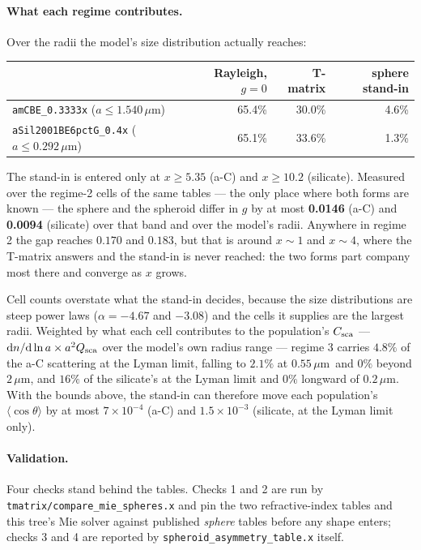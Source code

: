 \documentclass{my_memo}
\newcommand{\code}[1]{\texttt{#1}}
\newcommand{\um}{\ensuremath{\,\mu\mathrm{m}}}
\begin{document}
\paragraph{What each regime contributes.} Over the radii the model's size
distribution actually reaches:

\begin{center}
\begin{tabular}{@{}lrrr@{}}
\toprule
 & Rayleigh, $g=0$ & T-matrix & sphere stand-in \\
\midrule
\code{amCBE\_0.3333x} ($a \le 1.540$\um)        & 65.4\% & 30.0\% & 4.6\% \\
\code{aSil2001BE6pctG\_0.4x} ($a \le 0.292$\um) & 65.1\% & 33.6\% & 1.3\% \\
\bottomrule
\end{tabular}
\end{center}

\noindent The stand-in is entered only at $x \ge 5.35$ (a-C) and $x \ge 10.2$
(silicate). Measured over the regime-2 cells of the same tables --- the only
place where both forms are known --- the sphere and the spheroid differ in $g$
by at most \textbf{0.0146} (a-C) and \textbf{0.0094} (silicate) over that
band and over the model's radii. Anywhere in regime 2 the gap reaches $0.170$
and $0.183$, but that is around $x \sim 1$ and $x \sim 4$, where the T-matrix
answers and the stand-in is never reached: the two forms part company most
there and converge as $x$ grows.

Cell counts overstate what the stand-in decides, because the size
distributions are steep power laws ($\alpha = -4.67$ and $-3.08$) and the
cells it supplies are the largest radii. Weighted by what each cell
contributes to the population's $C_{\rm sca}$ --- ${\rm d}n/{\rm d}\ln a
\times a^2 Q_{\rm sca}$ over the model's own radius range --- regime 3 carries
$4.8\%$ of the a-C scattering at the Lyman limit, falling to $2.1\%$ at
$0.55$\um\ and $0\%$ beyond $2$\um, and $16\%$ of the silicate's at the Lyman
limit and $0\%$ longward of $0.2$\um. With the bounds above, the stand-in can
therefore move each population's $\langle\cos\theta\rangle$ by at most
$7\times10^{-4}$ (a-C) and $1.5\times10^{-3}$ (silicate, at the Lyman limit
only).

\paragraph{Validation.} Four checks stand behind the tables. Checks 1 and 2 are
run by \code{tmatrix/compare\_mie\_spheres.x} and pin the two refractive-index
tables and this tree's Mie solver against published \emph{sphere} tables before
any shape enters; checks 3 and 4 are reported by
\code{spheroid\_asymmetry\_table.x} itself.
\end{document}
